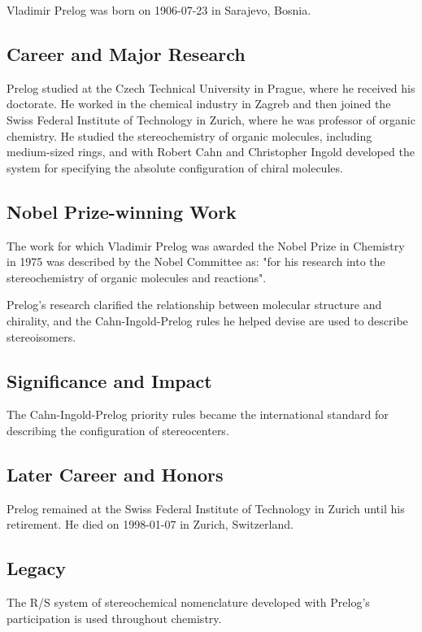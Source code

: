 Vladimir Prelog was born on 1906-07-23 in Sarajevo, Bosnia.

\subsection*{Career and Major Research}

Prelog studied at the Czech Technical University in Prague, where he received his doctorate. He worked in the chemical industry in Zagreb and then joined the Swiss Federal Institute of Technology in Zurich, where he was professor of organic chemistry. He studied the stereochemistry of organic molecules, including medium-sized rings, and with Robert Cahn and Christopher Ingold developed the system for specifying the absolute configuration of chiral molecules.

\subsection*{Nobel Prize-winning Work}

The work for which Vladimir Prelog was awarded the Nobel Prize in Chemistry in 1975 was described by the Nobel Committee as: "for his research into the stereochemistry of organic molecules and reactions".

Prelog's research clarified the relationship between molecular structure and chirality, and the Cahn-Ingold-Prelog rules he helped devise are used to describe stereoisomers.

\subsection*{Significance and Impact}

The Cahn-Ingold-Prelog priority rules became the international standard for describing the configuration of stereocenters.

\subsection*{Later Career and Honors}

Prelog remained at the Swiss Federal Institute of Technology in Zurich until his retirement. He died on 1998-01-07 in Zurich, Switzerland.

\subsection*{Legacy}

The R/S system of stereochemical nomenclature developed with Prelog's participation is used throughout chemistry.

